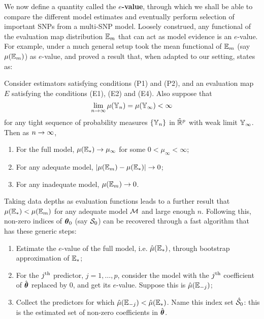 We now define a quantity called the \textbf{$e$-value}, through which we shall be able to compare the different model estimates and eventually perform selection of important SNPs from a multi-SNP model. Loosely construed, any functional of the evaluation map distribution ${\mathbb{E}}_{m}$ that can act as model evidence is an $e$-value. For example, under a much general setup \cite{MajumdarChatterjee17} took the mean functional of ${\mathbb{E}}_{m }$ (say $\mu ({\mathbb{E}}_{m })$) as $e$-value, and proved a result that, when adapted to our setting, states as:

\begin{Theorem}\label{thm:meanThm}
Consider estimators satisfying conditions (P1) and (P2), and an evaluation map $E$ satisfying the conditions (E1), (E2) and (E4). Also suppose that
%
$$
\lim_{n \rightarrow \infty} \mu ( {\mathbb{Y}}_n ) = \mu ( {\mathbb{Y}}_\infty) < \infty
$$
%
for any tight sequence of probability measures $\{ {\mathbb{Y}}_n \}$ in $\tilde {{\mathbb{R}}}^p$ with weak limit ${\mathbb{Y}}_\infty$. Then as $n \rightarrow \infty$,

\begin{enumerate}
\item For the full model, $\mu ({\mathbb{E}}_{* }) \rightarrow \mu_\infty$ for some $0 < \mu_\infty < \infty$;
\item For any adequate model, $| \mu ( {\mathbb{E}}_{m } ) - \mu ({\mathbb{E}}_{* }) | \rightarrow 0$;
\item For any inadequate model, $ \mu ( {\mathbb{E}}_{m }) \rightarrow 0$.
\end{enumerate}
\end{Theorem}

Taking data depths as evaluation functions leads to a further result that $\mu ({\mathbb{E}}_{* }) < \mu ({\mathbb{E}}_{m })$ for any adequate model ${\cal{M}}$ and large enough $n$. Following this, non-zero indices of ${\boldsymbol{\theta}}_0$ (say ${\cal{S}}_0$) can be recovered through a fast algorithm that has these generic steps:

\begin{enumerate}
\item Estimate the $e$-value of the full model, i.e. $\hat \mu ({\mathbb{E}}_{* })$, through bootstrap approximation of ${\mathbb{E}}_{* }$;
\item For the $j^{\operatorname*{\text{th}}}$ predictor, $j=1,\ldots, p$, consider the model with the $j^{\operatorname*{\text{th}}}$ coefficient of $\hat {{\boldsymbol{\theta}}}$ replaced by 0, and get its $e$-value. Suppose this is $\hat \mu ({\mathbb{E}}_{-j})$;
\item Collect the predictors for which $\hat \mu ({\mathbb{E}}_{-j}) < \hat \mu ({\mathbb{E}}_{* })$. Name this index set $\hat {{\cal{S}}}_0$: this is the estimated set of non-zero coefficients in $\hat {{\boldsymbol{\theta}}}$.
\end{enumerate}

